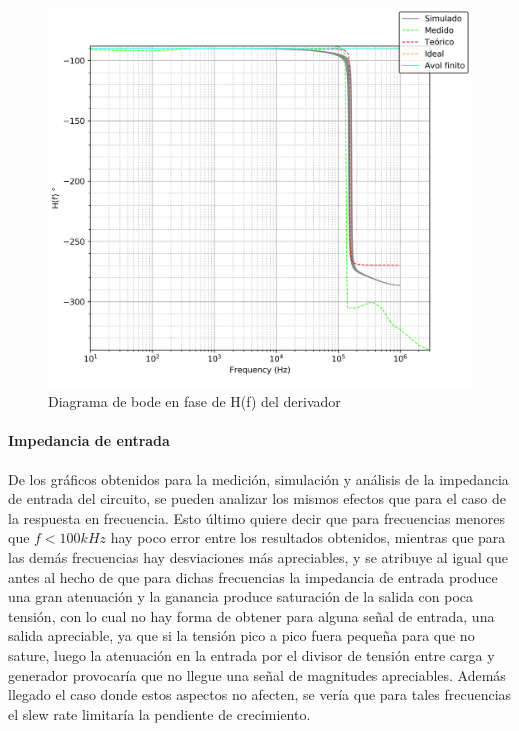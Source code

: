 \begin{figure}[H]
	\centering
	\includegraphics[scale=0.6]{Recursos/Derivador/bode_fase.png}
	\caption{Diagrama de bode en fase de H(f) del derivador}
	\label{fig:derivador_bode_fase}
\end{figure}

\paragraph*{Impedancia de entrada} De los gr\'aficos obtenidos para la medici\'on, simulaci\'on y an\'alisis de la impedancia
de entrada del circuito, se pueden analizar los mismos efectos que para el caso de la respuesta en frecuencia. Esto \'ultimo quiere decir que para frecuencias
menores que $f < 100kHz$ hay poco error entre los resultados obtenidos, mientras que para las dem\'as frecuencias hay desviaciones m\'as apreciables, y se atribuye
al igual que antes al hecho de que para dichas frecuencias la impedancia de entrada produce una gran atenuaci\'on y la ganancia produce saturaci\'on de la salida
con poca tensi\'on, con lo cual no hay forma de obtener para alguna se\~nal de entrada, una salida apreciable, ya que si la tensi\'on pico a pico fuera peque\~na para que no sature,
luego la atenuaci\'on en la entrada por el divisor de tensi\'on entre carga y generador provocar\'ia que no llegue una se\~nal de magnitudes apreciables. Adem\'as llegado el caso
donde estos aspectos no afecten, se ver\'ia que para tales frecuencias el slew rate limitar\'ia la pendiente de crecimiento.

